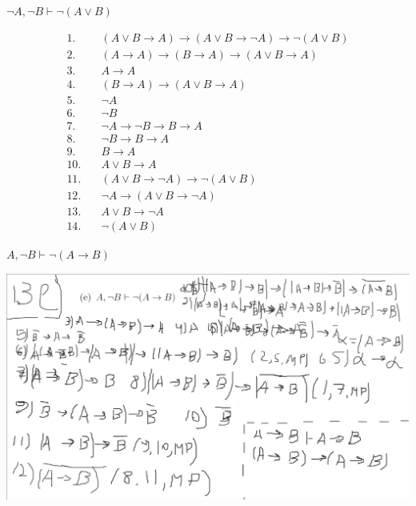 \begin{exercise}[3.d]
    \(\neg A, \neg B \vdash \neg (A \lor B)\)

    \begin{align*}
        1.\quad  & (A \lor B \to A) \to (A \lor B \to \neg A) \to \neg (A \lor B) \tag{a. 9} \\
        2.\quad  & (A \to A) \to (B \to A) \to (A \lor B \to A) \tag{a. 8}                   \\
        3.\quad  & A \to A \tag{доказано раннее}                                             \\
        4.\quad  & (B \to A) \to (A \lor B \to A) \tag{M.P. 2,3}                             \\
        5.\quad  & \neg A \tag{\(\in\Gamma\)}                                                \\
        6.\quad  & \neg B \tag{\(\in\Gamma\)}                                                \\
        7.\quad  & \neg A \to \neg B \to B \to A \tag{3.g}                                   \\
        8.\quad  & \neg B \to B \to A \tag{M.P. 5, 7}                                        \\
        9.\quad  & B \to A \tag{M.P. 6, 8}                                                   \\
        10.\quad & A \lor B \to A \tag{M.P. 4, 9}                                            \\
        11.\quad & (A \lor B \to \neg A) \to \neg (A \lor B) \tag{M.P. 1, 10}                \\
        12.\quad & \neg A \to (A \lor B \to \neg A) \tag{a. 1}                               \\
        13.\quad & A \lor B \to \neg A \tag{M.P. 5,12}                                       \\
        14.\quad & \neg (A \lor B) \tag{M.P. 11,13}
    \end{align*}
\end{exercise}

\begin{exercise}[3.e]
    \(A, \neg B \vdash \neg (A \to B)\)

    \includegraphics[width=\textwidth]{images/1.3.e.png}
\end{exercise}

